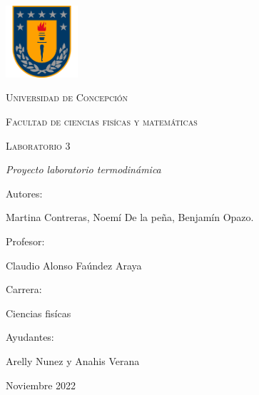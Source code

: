 \documentclass[a4paper, 12p]{article}
\begin{document}
\begin{titlepage}
      \begin{center}     
              
            \includegraphics[width=0.2\textwidth]{img/escudo_udec.png}                       %
            
            
            
            \vspace{1cm}
            \textsc{{\LARGE Universidad de Concepción}}
            
            \vspace{1cm}
            {\scshape\Large Facultad de ciencias fisícas y matemáticas \par}
            \vspace{2cm}
            {\scshape\Huge Laboratorio 3 \par}
            \vspace{2cm}
            {\itshape\Large Proyecto laboratorio termodinámica \par}
            \vfill
            {\Large Autores: \par}
            {\Large Martina Contreras, Noemí De la peña, Benjamín Opazo. \par}
            \vfill
            \vfill
            {\Large Profesor: \par}
            {\Large Claudio Alonso Faúndez Araya \par}
            \vfill
            \vfill
            {\Large Carrera: \par}
            {\Large Ciencias fisícas \par}
            \vfill
            \vfill
            {\Large Ayudantes: \par}
            {\Large Arelly Nunez y Anahis Verana \par}
            \vfill
            {\Large Noviembre 2022 \par}
      \end{center}
\end{titlepage}            
\end{document}

